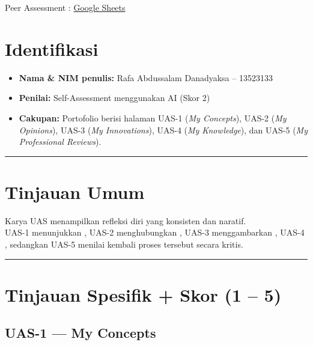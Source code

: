\documentclass[
  letterpaper,
  DIV=11,
  numbers=noendperiod]{scrreprt}
\providecommand{\tightlist}{%
  \setlength{\itemsep}{0pt}\setlength{\parskip}{0pt}}
\begin{document}
Peer Assessment :
\href{https://docs.google.com/spreadsheets/d/1k__L1Uy-ypmTN3m__wpPAYzPouQtxx3z/edit?usp=sharing&ouid=110892378776802188439&rtpof=true&sd=true}{Google
Sheets}

\section{Identifikasi}\label{identifikasi-1}

\begin{itemize}
\tightlist
\item
  \textbf{Nama \& NIM penulis:} Rafa Abdussalam Danadyaksa -- 13523133\\
\item
  \textbf{Penilai:} Self-Assessment menggunakan AI (Skor 2)\\
\item
  \textbf{Cakupan:} Portofolio berisi halaman UAS-1 (\emph{My
  Concepts}), UAS-2 (\emph{My Opinions}), UAS-3 (\emph{My Innovations}),
  UAS-4 (\emph{My Knowledge}), dan UAS-5 (\emph{My Professional
  Reviews}).
\end{itemize}

\begin{center}\rule{0.5\linewidth}{0.5pt}\end{center}

\section{Tinjauan Umum}\label{tinjauan-umum-1}

Karya UAS menampilkan refleksi diri yang konsisten dan naratif.\\
UAS-1 menunjukkan , UAS-2 menghubungkan , UAS-3 menggambarkan , UAS-4 ,
sedangkan UAS-5 menilai kembali proses tersebut secara kritis.

\begin{center}\rule{0.5\linewidth}{0.5pt}\end{center}

\section{Tinjauan Spesifik + Skor (1 --
5)}\label{tinjauan-spesifik-skor-1-5-1}

\subsection{\texorpdfstring{\textbf{UAS-1 --- My
Concepts}}{UAS-1 --- My Concepts}}\label{uas-1-my-concepts-1}
\end{document}
